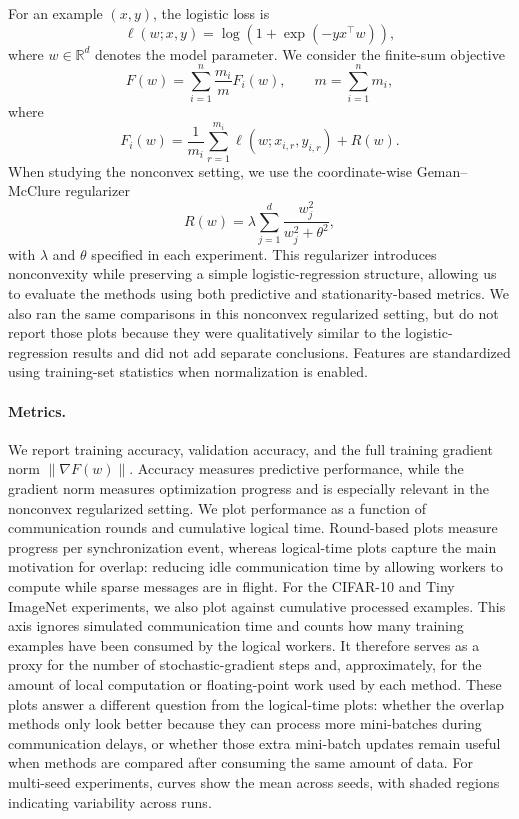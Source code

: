 \documentclass{article}
\theoremstyle{plain}
\theoremstyle{definition}
\begin{document}
For an example $(x,y)$, the logistic loss is
\begin{equation}
    \ell(w;x,y)
    =
    \log\left(1+\exp\left(-y x^\top w\right)\right),
\end{equation}
where $w \in \mathbb{R}^{d}$ denotes the model parameter. 
We consider the finite-sum objective
\begin{equation}
    F(w)
    =
    \sum_{i=1}^{n}
    \frac{m_i}{m}
    F_i(w),
    \qquad
    m = \sum_{i=1}^{n} m_i,
\end{equation}
where
\begin{equation}
    F_i(w)
    =
    \frac{1}{m_i}
    \sum_{r=1}^{m_i}
    \ell(w;x_{i,r},y_{i,r})
    +
    R(w).
\end{equation}
When studying the nonconvex setting, we use the coordinate-wise Geman--McClure regularizer
\begin{equation}
    R(w)
    =
    \lambda \sum_{j=1}^{d}
    \frac{w_j^2}{w_j^2+\theta^2},
\end{equation}
with $\lambda$ and $\theta$ specified in each experiment. 
This regularizer introduces nonconvexity while preserving a simple logistic-regression structure, allowing us to evaluate the methods using both predictive and stationarity-based metrics. 
We also ran the same comparisons in this nonconvex regularized setting, but do not report those plots because they were qualitatively similar to the logistic-regression results and did not add separate conclusions.
Features are standardized using training-set statistics when normalization is enabled.

\paragraph{Metrics.}
We report training accuracy, validation accuracy, and the full training gradient norm $\|\nabla F(w)\|$. 
Accuracy measures predictive performance, while the gradient norm measures optimization progress and is especially relevant in the nonconvex regularized setting. 
We plot performance as a function of communication rounds and cumulative logical time. 
Round-based plots measure progress per synchronization event, whereas logical-time plots capture the main motivation for overlap: reducing idle communication time by allowing workers to compute while sparse messages are in flight. 
For the CIFAR-10 and Tiny ImageNet experiments, we also plot against cumulative processed examples.
This axis ignores simulated communication time and counts how many training examples have been consumed by the logical workers.
It therefore serves as a proxy for the number of stochastic-gradient steps and, approximately, for the amount of local computation or floating-point work used by each method.
These plots answer a different question from the logical-time plots: whether the overlap methods only look better because they can process more mini-batches during communication delays, or whether those extra mini-batch updates remain useful when methods are compared after consuming the same amount of data.
For multi-seed experiments, curves show the mean across seeds, with shaded regions indicating variability across runs.
\end{document}
